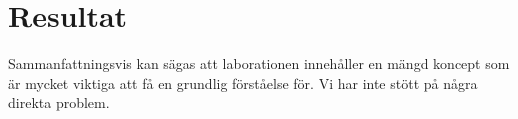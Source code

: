 %
%

\section{Resultat}\label{resultat}
Sammanfattningsvis kan sägas att laborationen innehåller en mängd koncept som
är mycket viktiga att få en grundlig förståelse för. Vi har inte stött på några
direkta problem.

